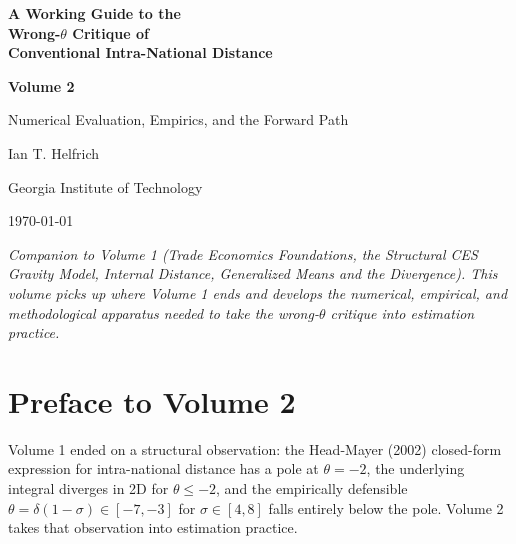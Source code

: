 \documentclass[11pt,letterpaper,oneside]{book}
\theoremstyle{definition}
\theoremstyle{remark}
\begin{document}
\begin{titlepage}
\centering
\vspace*{2cm}
{\Huge\bfseries A Working Guide to the\\[6pt] Wrong-$\theta$ Critique of\\[4pt] Conventional Intra-National Distance\par}
\vspace{1cm}
{\LARGE\color{rust}\bfseries Volume 2\par}
{\Large Numerical Evaluation, Empirics, and the Forward Path\par}
\vspace{2cm}
{\Large Ian T. Helfrich\par}
\vspace{0.5cm}
{\large Georgia Institute of Technology\par}
\vspace{1.5cm}
{\large \today\par}
\vfill
{\color{dim}\itshape Companion to Volume 1 (Trade Economics Foundations, the Structural CES Gravity Model, Internal Distance, Generalized Means and the Divergence). This volume picks up where Volume 1 ends and develops the numerical, empirical, and methodological apparatus needed to take the wrong-$\theta$ critique into estimation practice.}
\vspace{1cm}
\end{titlepage}

\tableofcontents
\newpage

\chapter*{Preface to Volume 2}

Volume 1 ended on a structural observation: the Head-Mayer (2002) closed-form
expression for intra-national distance has a pole at $\theta = -2$, the
underlying integral diverges in 2D for $\theta \leq -2$, and the
empirically defensible $\theta = \delta(1-\sigma) \in [-7, -3]$ for
$\sigma \in [4, 8]$ falls entirely below the pole. Volume 2 takes that
observation into estimation practice.
\end{document}
